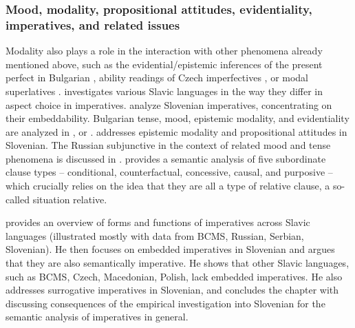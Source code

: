 \documentclass[output=paper,colorlinks,citecolor=brown]{langscibook}
\begin{document}
\subsubsection{Mood, modality, propositional attitudes, evidentiality, imperatives, and related issues} Modality also plays a role in the interaction with other phenomena already mentioned above, such as the evidential/epistemic inferences of the present perfect in Bulgarian \citep{Izvorski1997}, ability readings of Czech imperfectives \citep{docekal-kucerova09}, or modal superlatives \citep{goncharov15}. \citet{alvestad14} investigates various Slavic languages in the way they differ in aspect choice in imperatives. %
\citet{stegoveckaufmann} analyze Slovenian imperatives, concentrating on their embeddability. Bulgarian tense, mood, epistemic modality, and evidentiality are analyzed in \citet{smirnova11,Koev2017a,Goncharov.Irimia2020}, or \citet{Karagjosova2021}. \citet{mocnik18,mocnikdiss} addresses epistemic modality and propositional attitudes in Slovenian. The Russian subjunctive in the context of related mood and tense phenomena is discussed in \citet{zimmermann2016}. \citet{Arsenijevic2021} provides a semantic analysis of five subordinate clause types -- conditional, counterfactual, concessive, causal, and purposive -- which crucially relies on the idea that they are all a type of relative clause, a so-called situation relative.

 provides an overview of forms and functions of imperatives across Slavic languages (illustrated mostly with data from BCMS, Russian, Serbian, Slovenian). He then focuses on embedded imperatives in Slovenian and argues that they are also semantically imperative. He shows that other Slavic languages, such as BCMS, Czech, Macedonian, Polish, lack embedded imperatives. He also addresses surrogative imperatives in Slovenian, and concludes the chapter with discussing consequences of the empirical investigation into Slovenian for the semantic analysis of imperatives in general.
\end{document}
